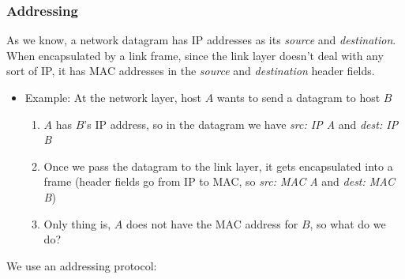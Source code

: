 \documentclass{article}
\begin{document}
\subsubsection{Addressing}
As we know, a network datagram has IP addresses as its \textit{source} and \textit{destination}. When 
encapsulated by a link frame, since the link layer doesn't deal with any sort of IP, it has MAC 
addresses in the \textit{source} and \textit{destination} header fields. 
\begin{itemize}
    \item Example: At the network layer, host $A$ wants to send a datagram to host $B$
    \begin{enumerate}
        \item $A$ has $B$'s IP address, so in the datagram we have \textit{src: IP A} and 
        \textit{dest: IP B}
        \item Once we pass the datagram to the link layer, it gets encapsulated into a frame (header fields
        go from IP to MAC, so \textit{src: MAC A} and \textit{dest: MAC B})
        \item Only thing is, $A$ does not have the MAC address for $B$, so what do we do?
    \end{enumerate}
\end{itemize}
We use an addressing protocol:
\end{document}
